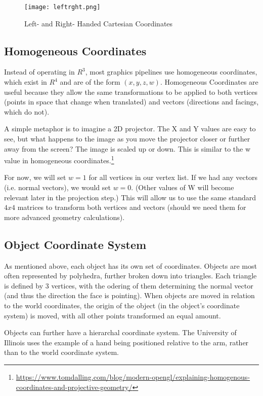 \documentclass{article}
\begin{document}
\begin{figure}[H]
    \centering
    \texttt{[image: leftrght.png]}
    \caption{Left- and Right- Handed Cartesian Coordinates}
    \label{LeftRight}
\end{figure}

\subsection{Homogeneous Coordinates}
Instead of operating in $R^3$, most graphics pipelines use homogeneous coordinates, which exist in $R^4$ and are of the form $(x, y, z, w)$. Homogeneous Coordinates are useful because they allow the same transformations to be applied to both vertices (points in space that change when translated) and vectors (directions and facings, which do not).

A simple metaphor is to imagine a 2D projector. The X and Y values are easy to see, but what happens to the image as you move the projector closer or further away from the screen? The image is scaled up or down. This is similar to the w value in homogeneous coordinates.\footnote{\url{https://www.tomdalling.com/blog/modern-opengl/explaining-homogenous-coordinates-and-projective-geometry/}} 

For now, we will set $w = 1$ for all vertices in our vertex list. If we had any vectors (i.e. normal vectors), we would set $w = 0$. (Other values of W will become relevant later in the projection step.) This will allow us to use the same standard $4x4$ matrices to transform both vertices and vectors (should we need them for more advanced geometry calculations).

\subsection{Object Coordinate System}
As mentioned above, each object has its own set of coordinates. Objects are most often represented by polyhedra, further broken down into triangles. Each triangle is defined by 3 vertices, with the odering of them determining the normal vector (and thus the direction the face is pointing). When objects are moved in relation to the world coordinates, the origin of the object (in the object's coordinate system) is moved, with all other points transformed an equal amount.

Objects can further have a hierarchal coordinate system. The University of Illinois uses the example of a hand being positioned relative to the arm, rather than to the world coordinate system. 
\end{document}

